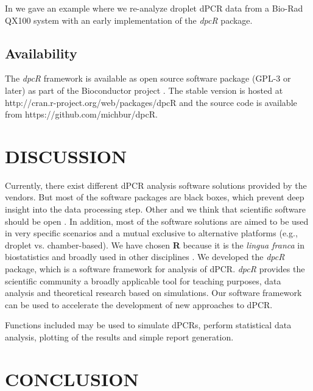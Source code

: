 \documentclass[a4,center,fleqn]{NAR}
\begin{document}
In \cite{rodiger_r_2015} we gave an example where we re-analyze droplet dPCR 
data from a Bio-Rad QX100 system with an early implementation of the 
\textit{dpcR} package.

\subsection{Availability}

The \textit{dpcR} framework is available as open source software package (GPL-3 
or later) as part of the Bioconductor project \cite{gentleman_2004}. The stable 
version is hosted at http://cran.r-project.org/web/packages/dpcR and the source 
code is available from  https://github.com/michbur/dpcR.

\section{DISCUSSION}

Currently, there exist different dPCR analysis software solutions provided by 
the vendors. But most of the software packages are black boxes, which 
prevent deep insight into the data processing step. Other and we think that 
scientific software should be open \cite{morin_shining_2012, ince_case_2012, 
rodiger_r_2015}. In addition, most of the software solutions are aimed to be 
used in very specific scenarios and a mutual exclusive to alternative platforms 
(e.g., droplet vs. chamber-based). We have chosen \textbf{R} because it is the 
\textit{lingua franca} in biostatistics and broadly used in other disciplines 
\cite{rodiger_r_2015}. We developed the \textit{dpcR} package, which is a 
software framework for analysis of dPCR. \textit{dpcR} provides the scientific 
community a broadly applicable tool for teaching purposes, data analysis and 
theoretical research based on simulations. Our software framework can be used to 
accelerate the development of new approaches to dPCR.

Functions included may be used to simulate dPCRs, perform statistical data 
analysis, plotting of the results and simple report generation. 

\section{CONCLUSION}
\end{document}
